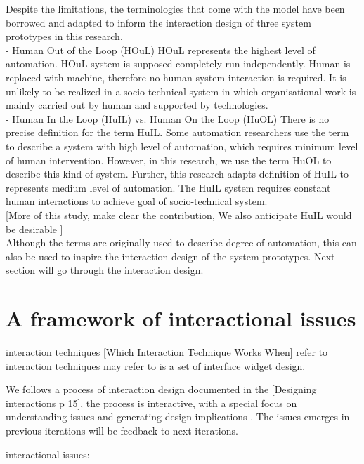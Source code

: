 Despite the limitations, the terminologies that come with the model have been borrowed and adapted to inform the interaction design of three system prototypes in this research. \\

- Human Out of the Loop (HOuL)
HOuL represents the highest level of automation. HOuL system is supposed completely run independently. Human is replaced with machine, therefore no human system interaction is required. It is unlikely to be realized in a socio-technical system in which organisational work is mainly carried out by human and supported by technologies. \\

- Human In the Loop (HuIL) vs. Human On the Loop (HuOL)
There is no precise definition for the term HuIL. Some automation researchers use the term to describe a system with high level of automation, which requires minimum level of human intervention. However, in this research, we use the term HuOL to describe this kind of system. Further, this research adapts definition of HuIL to represents medium level of automation. The HuIL system requires constant human interactions to achieve goal of socio-technical system.\\

[More of this study, make clear the contribution, We also anticipate HuIL would be desirable ]\\

Although the terms are originally used to describe degree of automation, this can also be used to inspire the interaction design of the system prototypes. Next section will go through the interaction design.\\



\section{A framework of interactional issues}\label{sec:interactional}
interaction techniques 
[Which Interaction Technique Works When] refer to interaction techniques may refer to is a set of interface widget design.


We follows a process of interaction design documented in the [Designing interactions p 15], the process is interactive, with a special focus on understanding issues and generating design implications . The issues emerges in previous iterations will be feedback to next iterations. 

interactional issues: 

